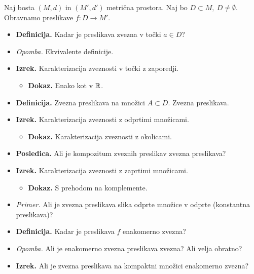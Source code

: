 \begin{enumerate}
    Naj bosta $(M,d)$ in $(M',d')$ metrična prostora. Naj bo $D \subset M, \ D \neq \emptyset$. Obravnamo preslikave $f: D \to M'$.
    \begin{itemize}
        \item \colorbox{purple!30}{\textbf{Definicija.}} Kadar je preslikava zvezna v točki $a \in D$?
        \item \colorbox{yellow!30}{\emph{Opomba.}} Ekvivalente definicije.
        \item \colorbox{blue!30}{\textbf{Izrek.}} Karakterizacija zveznosti v točki z zaporedji.
        \begin{itemize}
            \item \colorbox{green!30}{\textbf{Dokaz.}} Enako kot v $\mathbb{R}$.
        \end{itemize}
        \item \colorbox{purple!30}{\textbf{Definicija.}} Zvezna preslikava na množici $A \subset D$. Zvezna preslikava.
        \item \colorbox{blue!30}{\textbf{Izrek.}} Karakterizacija zveznosti z odprtimi množicami.
        \begin{itemize}
            \item \colorbox{green!30}{\textbf{Dokaz.}} Karakterizacija zveznosti z okolicami.
        \end{itemize}
        \item \colorbox{orange!30}{\textbf{Posledica.}} Ali je kompozitum zveznih preslikav zvezna preslikava?
        \item \colorbox{blue!30}{\textbf{Izrek.}} Karakterizacija zveznosti z zaprtimi množicami.
        \begin{itemize}
            \item \colorbox{green!30}{\textbf{Dokaz.}} S prehodom na komplemente.
        \end{itemize}
        \item \colorbox{yellow!30}{\emph{Primer.}} Ali je zvezna preslikava slika odprte množice v odprte (konstantna preslikava)?
        \item \colorbox{purple!30}{\textbf{Definicija.}} Kadar je preslikava $f$ enakomerno zvezna?
        \item \colorbox{yellow!30}{\emph{Opomba.}} Ali je enakomerno zvezna preslikava zvezna? Ali velja obratno?
        \item \colorbox{blue!30}{\textbf{Izrek.}} Ali je zvezna preslikava na kompaktni množici enakomerno zvezna?
        \begin{itemize}

\end{itemize}
\end{itemize}
\end{enumerate}

